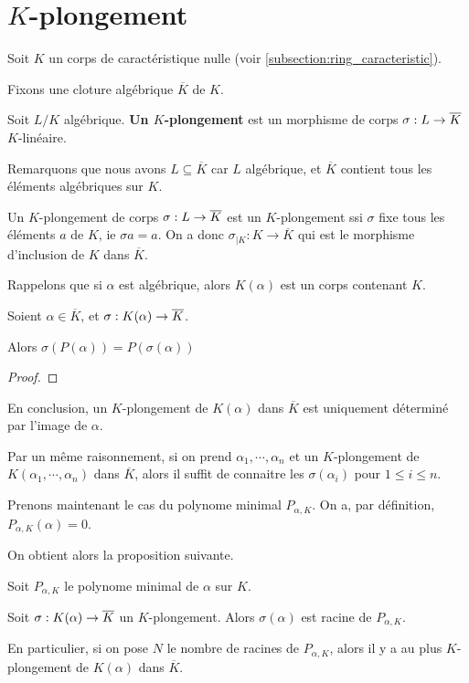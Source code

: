 \section{$K$-plongement}

Soit $K$ un corps de caractéristique nulle (voir
\ref{subsection:ring_caracteristic}).

Fixons une cloture algébrique $\overline{K}$ de $K$.

\begin{definition}
	Soit $L/K$ algébrique.
	\textbf{Un $K$-plongement} est un morphisme de corps
	$\sigma : L \rightarrow \overline{K}$ $K$-linéaire.
\end{definition}

Remarquons que nous avons $L \subseteq \overline{K}$ car $L$ algébrique, et
$\overline{K}$ contient tous les éléments algébriques sur $K$.

Un $K$-plongement de corps $\sigma : L \rightarrow \overline{K}$ est un
$K$-plongement ssi $\sigma$ fixe tous les éléments $a$ de $K$, ie $\sigma{a} =
a$.
On a donc $\sigma_{|K} : K \rightarrow \overline{K}$ qui est le morphisme
d'inclusion de $K$ dans $\overline{K}$.

Rappelons que si $\alpha$ est algébrique, alors $K(\alpha)$ est un corps
contenant $K$.

\begin{proposition}
	Soient $\alpha \in \overline{K}$, et
	$\sigma : K(\alpha) \rightarrow \overline{K}$.

	Alors $\sigma(P(\alpha)) = P(\sigma(\alpha))$
\end{proposition}

\ifdefined\outputproof
\begin{proof}

\end{proof}
\fi

En conclusion, un $K$-plongement de $K(\alpha)$ dans $\overline{K}$ est
uniquement déterminé par l'image de $\alpha$.

Par un même raisonnement, si on prend $\alpha_{1}, \cdots, \alpha_{n}$ et un
$K$-plongement de $K(\alpha_{1}, \cdots, \alpha_{n})$ dans $\overline{K}$, alors
il suffit de connaitre les $\sigma(\alpha_{i})$ pour $1 \leq i \leq n$.

Prenons maintenant le cas du polynome minimal $P_{\alpha, K}$.
On a, par définition, $P_{\alpha, K}(\alpha) = 0$.

On obtient alors la proposition suivante.

\begin{proposition}
	Soit $P_{\alpha, K}$ le polynome minimal de $\alpha$ sur $K$.

	Soit $\sigma : K(\alpha) \rightarrow \overline{K}$ un $K$-plongement. Alors
	$\sigma(\alpha)$ est racine de $P_{\alpha, K}$.

	En particulier, si on pose $N$ le nombre de racines de $P_{\alpha, K}$,
	alors il y a au plus $K$-plongement de $K(\alpha)$ dans $\overline{K}$.
\end{proposition}

